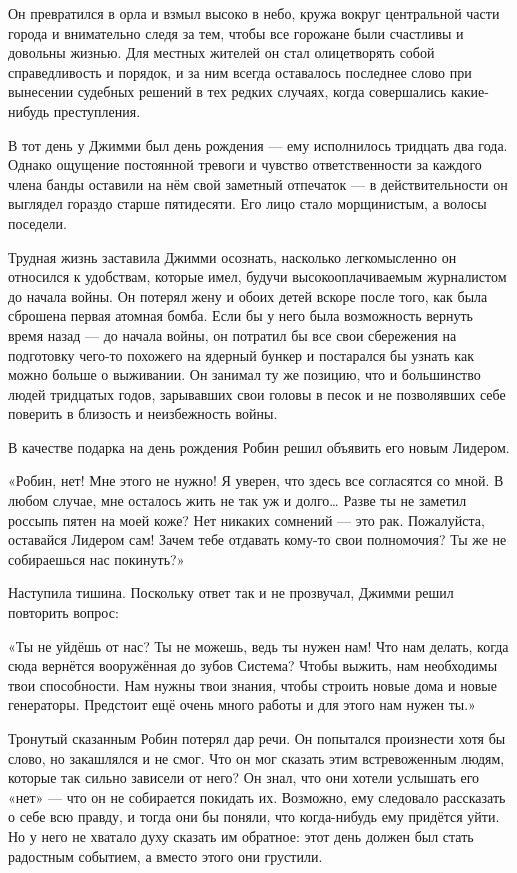 \documentclass[a5paper, 9pt,
final, openany, twoside=true]{memoir}
\begin{document}
Он превратился в орла и взмыл высоко в небо, кружа вокруг центральной части города и внимательно следя за тем, чтобы все горожане были счастливы и довольны жизнью. Для местных жителей он стал олицетворять собой справедливость и порядок, и за ним всегда оставалось последнее слово при вынесении судебных решений в тех редких случаях, когда совершались какие-нибудь преступления.\bigskip

В тот день у Джимми был день рождения — ему исполнилось тридцать два года. Однако ощущение постоянной тревоги и чувство ответственности за каждого члена банды оставили на нём свой заметный отпечаток — в действительности он выглядел гораздо старше пятидесяти. Его лицо стало морщинистым, а волосы поседели.

Трудная жизнь заставила Джимми осознать, насколько легкомысленно он относился к удобствам, которые имел, будучи высокооплачиваемым журналистом до начала войны. Он потерял жену и обоих детей вскоре после того, как была сброшена первая атомная бомба. Если бы у него была возможность вернуть время назад — до начала войны, он потратил бы все свои сбережения на подготовку чего-то похожего на ядерный бункер и постарался бы узнать как можно больше о выживании. Он занимал ту же позицию, что и большинство людей тридцатых годов, зарывавших свои головы в песок и не позволявших себе поверить в близость и неизбежность войны.

В качестве подарка на день рождения Робин решил объявить его новым Лидером.\bigskip

«Робин, нет! Мне этого не нужно! Я уверен, что здесь все согласятся со мной. В любом случае, мне осталось жить не так уж и долго… Разве ты не заметил россыпь пятен на моей коже? Нет никаких сомнений — это рак. Пожалуйста, оставайся Лидером сам! Зачем тебе отдавать кому-то свои полномочия? Ты же не собираешься нас покинуть?»

Наступила тишина. Поскольку ответ так и не прозвучал, Джимми решил повторить вопрос:

«Ты не уйдёшь от нас? Ты не можешь, ведь ты нужен нам! Что нам делать, когда сюда вернётся вооружённая до зубов Система? Чтобы выжить, нам необходимы твои способности. Нам нужны твои знания, чтобы строить новые дома и новые генераторы. Предстоит ещё очень много работы и для этого нам нужен ты.»

Тронутый сказанным Робин потерял дар речи. Он попытался произнести хотя бы слово, но закашлялся и не смог. Что он мог сказать этим встревоженным людям, которые так сильно зависели от него? Он знал, что они хотели услышать его «нет» — что он не собирается покидать их. Возможно, ему следовало рассказать о себе всю правду, и тогда они бы поняли, что когда-нибудь ему придётся уйти. Но у него не хватало духу сказать им обратное: этот день должен был стать радостным событием, а вместо этого они грустили.
\end{document}

